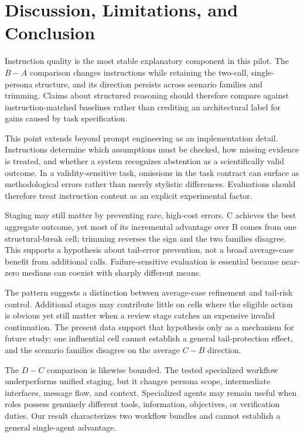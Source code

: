 \section{Discussion, Limitations, and Conclusion}
\label{sec:discussion}

Instruction quality is the most stable explanatory component in this pilot.
The \(B-A\) comparison changes instructions while retaining the two-call,
single-persona structure, and its direction persists across scenario families
and trimming.  Claims about structured reasoning should therefore compare
against instruction-matched baselines rather than crediting an architectural
label for gains caused by task specification.

This point extends beyond prompt engineering as an implementation detail.
Instructions determine which assumptions must be checked, how missing evidence
is treated, and whether a system recognizes abstention as a scientifically
valid outcome.  In a validity-sensitive task, omissions in the task contract
can surface as methodological errors rather than merely stylistic differences.
Evaluations should therefore treat instruction content as an explicit
experimental factor.

Staging may still matter by preventing rare, high-cost errors.  C achieves
the best aggregate outcome, yet most of its incremental advantage over B
comes from one structural-break cell; trimming reverses the sign and the two
families disagree.  This supports a hypothesis about tail-error prevention,
not a broad average-case benefit from additional calls.  Failure-sensitive
evaluation is essential because near-zero medians can coexist with sharply
different means.

The pattern suggests a distinction between average-case refinement and
tail-risk control.  Additional stages may contribute little on cells where the
eligible action is obvious yet still matter when a review stage catches an
expensive invalid continuation.  The present data support that hypothesis only
as a mechanism for future study: one influential cell cannot establish a
general tail-protection effect, and the scenario families disagree on the
average \(C-B\) direction.

The \(D-C\) comparison is likewise bounded.  The tested specialized workflow
underperforms unified staging, but it changes persona scope, intermediate
interfaces, message flow, and context.  Specialized agents may remain useful
when roles possess genuinely different tools, information, objectives, or
verification duties.  Our result characterizes two workflow bundles and
cannot establish a general single-agent advantage.

